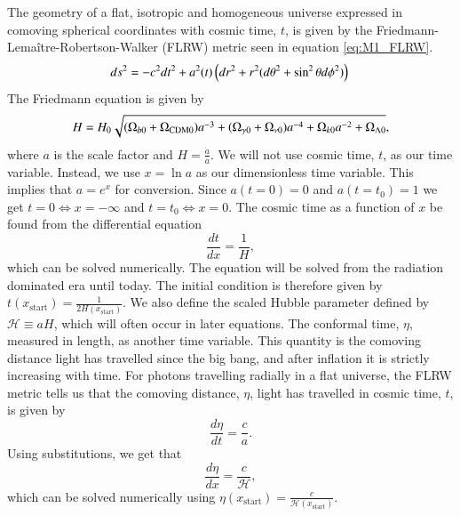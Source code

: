 \documentclass{aa}
\begin{document}
\noindent
The geometry of a flat, isotropic and homogeneous universe expressed in comoving spherical coordinates with cosmic time, $t$, is given by the Friedmann-Lemaître-Robertson-Walker (FLRW) metric seen in equation \ref{eq:M1_FLRW}.
\begin{equation}\label{eq:M1_FLRW}
   ds^2 = -c^2 dt^2 + a^2(t) \left(dr^2 + r^2 (d\theta^2 + \sin^2\theta 
d\phi^2)\right) \\
\end{equation}
The Friedmann equation is given by
\begin{equation}\label{Friedmann}
      H = H_0 \sqrt{(\Omega_{b0}+\Omega_{\rm CDM 0})a^{-3} + (\Omega_{\gamma 0} + \Omega_{\nu 0}) a^{-4} + \Omega_{k 0} a^{-2} + \Omega_{\Lambda 0}},
\end{equation}
where $a$ is the scale factor and  $H = \frac{\dot{a}}{a}$. We will not use cosmic time, $t$, as our time variable.
Instead, we use $x=\ln a$ as our dimensionless time variable. This implies that $a = e^x$ for conversion. Since $a(t=0)=0$ and $a(t=t_0)=1$
we get $t=0 \iff x = -\infty$ and $t=t_0 \iff x = 0$. The cosmic time as a function of $x$ be found from the differential equation 
\begin{equation}\label{cosmic_time_differential_equation}
      \frac{dt}{dx} = \frac{1}{H},
\end{equation}
which can be solved numerically. The equation will be solved from the radiation dominated era until today. The initial condition is therefore given by $t(x_\mathrm{start})=\frac{1}{2H(x_\mathrm
{start})}$. We also define the scaled Hubble parameter defined by $\mathcal{H}\equiv aH$, which will often occur in later equations.
The conformal time, $\eta$, measured in length, as another time variable. This quantity is the comoving distance light has travelled since the big bang,
and after inflation it is strictly increasing with time. For photons travelling radially in a flat universe, the FLRW metric tells us that the comoving distance, $\eta$, 
light has travelled in cosmic time, $t$, is given by
\begin{equation}
   \frac{d\eta}{dt} = \frac{c}{a}. 
\end{equation}
Using substitutions, we get that
\begin{equation}
   \frac{d\eta}{dx} = \frac{c}{\mathcal
   H},
\end{equation}
which can be solved numerically using $\eta(x_\mathrm{start})=\frac{c}{\mathcal{H}(x_\mathrm{start})}$.
\noindent
\\ \\
\end{document}
